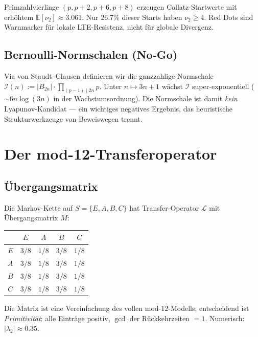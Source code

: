 \documentclass[12pt,a4paper]{article}
\newcommand{\vii}{\nu_2}
\begin{document}
Primzahlvierlinge $(p,p+2,p+6,p+8)$ erzeugen Collatz-Startwerte mit
erhöhtem $\mathbb{E}[\vii] \approx 3.061$. Nur 26.7\% dieser Starts haben
$\vii \geq 4$. Red Dots sind Warnmarker für lokale LTE-Resistenz, nicht
für globale Divergenz.

\subsection{Bernoulli-Normschalen (No-Go)}

Via von Staudt--Clausen definieren wir die ganzzahlige Normschale
$\mathcal{I}(n) := |B_{2n}| \cdot \prod_{(p-1)\mid 2n} p$.
Unter $n \mapsto 3n+1$ wächst $\mathcal{I}$ super-exponentiell
($\sim 6n\log(3n)$ in der Wachstumsordnung). Die Normschale ist damit
\emph{kein} Lyapunov-Kandidat --- ein wichtiges negatives Ergebnis,
das heuristische Strukturwerkzeuge von Beweiswegen trennt.

\section{Der mod-12-Transferoperator}
\label{sec:rpf}

\subsection{Übergangsmatrix}

Die Markov-Kette auf $S = \{E,A,B,C\}$ hat Transfer-Operator $\mathcal{L}$
mit Übergangsmatrix $M$:

\begin{center}
\begin{tabular}{c|cccc}
\toprule
 & $E$ & $A$ & $B$ & $C$ \\
\midrule
$E$ & $3/8$ & $1/8$ & $3/8$ & $1/8$ \\
$A$ & $3/8$ & $1/8$ & $3/8$ & $1/8$ \\
$B$ & $3/8$ & $1/8$ & $3/8$ & $1/8$ \\
$C$ & $3/8$ & $1/8$ & $3/8$ & $1/8$ \\
\bottomrule
\end{tabular}
\end{center}

\begin{tcolorbox}[heuristik]
Die Matrix ist eine Vereinfachung des vollen mod-$12$-Modells;
entscheidend ist \emph{Primitivität}: alle Einträge positiv,
$\gcd$ der Rückkehrzeiten $= 1$.
Numerisch: $|\lambda_2| \approx 0.35$.
\end{tcolorbox}
\end{document}
